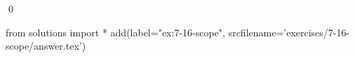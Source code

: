 
\begin{ex}
  \label{ex:7-16-scope}
  
  \qed
\end{ex}
\begin{python0}
from solutions import *
add(label="ex:7-16-scope",
    srcfilename='exercises/7-16-scope/answer.tex')
\end{python0}
